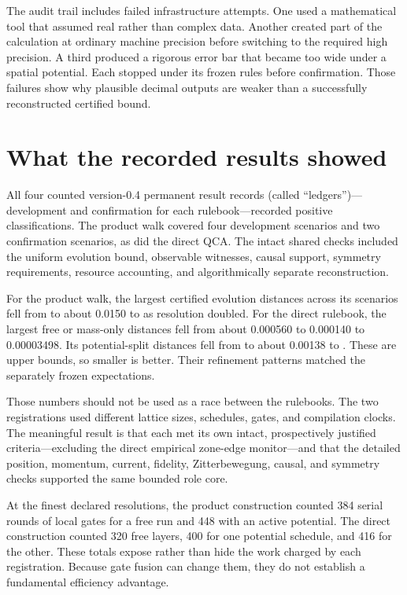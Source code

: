 \documentclass[11pt]{article}
\begin{document}
The audit trail includes failed infrastructure attempts.  One used a
mathematical tool that assumed real rather than complex data.  Another created
part of the calculation at ordinary machine precision before switching to the
required high precision.  A third produced a rigorous error bar that became too
wide under a spatial potential.  Each stopped under its frozen rules before
confirmation.  Those failures show why plausible decimal outputs are weaker
than a successfully reconstructed certified bound.

\section{What the recorded results showed}

All four counted version-0.4 permanent result records (called
``ledgers'')---development and confirmation for each rulebook---recorded
positive classifications.  The product walk covered four
development scenarios and two confirmation scenarios, as did the direct QCA.
The intact shared checks included the uniform evolution bound, observable
witnesses, causal support, symmetry requirements, resource accounting, and
algorithmically separate reconstruction.

For the product walk, the largest certified evolution distances across its
scenarios fell from \ProductOperatorMax{} to about 0.0150 to
\ProductFineOperatorMax{} as resolution doubled.
For the direct rulebook, the largest free or mass-only distances fell from
about 0.000560 to 0.000140 to 0.00003498.  Its potential-split distances fell
from \DirectOperatorMax{} to about 0.00138 to \DirectFineOperatorMax{}.  These
are upper bounds, so smaller is better.  Their refinement patterns matched the separately frozen
expectations.

Those numbers should not be used as a race between the rulebooks.  The two
registrations used different lattice sizes, schedules, gates, and compilation
clocks.  The meaningful result is that each met its own intact, prospectively
justified criteria---excluding the direct empirical zone-edge monitor---and that
the detailed position, momentum, current, fidelity,
Zitterbewegung, causal, and symmetry checks supported the same bounded role
core.

At the finest declared resolutions, the product construction counted 384
serial rounds of local gates for a free run and 448 with an active potential.  The direct
construction counted 320 free layers, 400 for one potential schedule, and 416
for the other.  These totals expose rather than hide the work charged by each
registration.  Because gate fusion can change them, they do not establish a
fundamental efficiency advantage.
\end{document}
